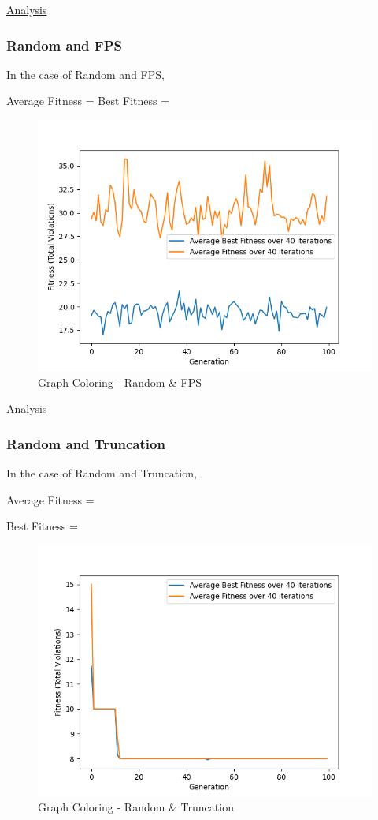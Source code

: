 \documentclass[11pt, letterpaper]{article}
\begin{document}
\underline{Analysis}

\subsubsection {Random and FPS}
In the case of Random and FPS,

Average Fitness = 
Best Fitness = 

\begin{figure}[H]
    \centering
    \includegraphics[scale = 0.6]{images/graphcoloring_rd_fp.png}
    \caption {Graph Coloring - Random \& FPS}
    \label {fig:gcRB}
\end{figure}

\underline{Analysis}

\subsubsection {Random and Truncation}
In the case of Random and Truncation,

Average Fitness = 

Best Fitness = 
\begin{figure}[H]
    \centering
    \includegraphics[scale = 0.6]{images/graphcoloring_rd_tr.png}
    \caption {Graph Coloring - Random \& Truncation}
    \label {fig:gcRT}
\end{figure}
\end{document}
